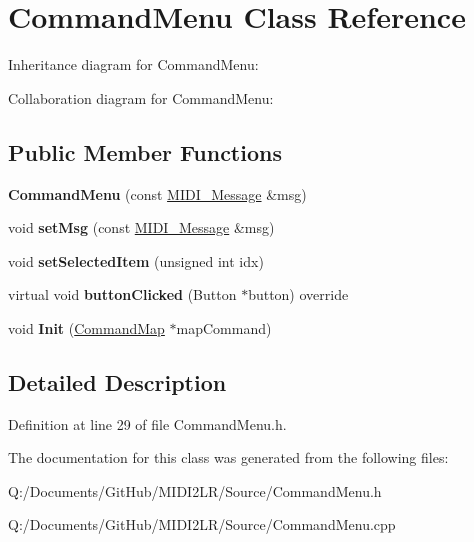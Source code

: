 \hypertarget{class_command_menu}{}\section{Command\+Menu Class Reference}
\label{class_command_menu}


Inheritance diagram for Command\+Menu\+:


Collaboration diagram for Command\+Menu\+:
\subsection*{Public Member Functions}
\begin{DoxyCompactItemize}
\item 
{\bfseries Command\+Menu} (const \hyperlink{struct_m_i_d_i___message}{M\+I\+D\+I\+\_\+\+Message} \&msg)\hypertarget{class_command_menu_a927cb9d3c584384039ac60f0aa12c250}{}\label{class_command_menu_a927cb9d3c584384039ac60f0aa12c250}

\item 
void {\bfseries set\+Msg} (const \hyperlink{struct_m_i_d_i___message}{M\+I\+D\+I\+\_\+\+Message} \&msg)\hypertarget{class_command_menu_abe597cac4bdbd0247b823d0b1d540838}{}\label{class_command_menu_abe597cac4bdbd0247b823d0b1d540838}

\item 
void {\bfseries set\+Selected\+Item} (unsigned int idx)\hypertarget{class_command_menu_aca42c2d962a51a0ab0d4450492aa44a9}{}\label{class_command_menu_aca42c2d962a51a0ab0d4450492aa44a9}

\item 
virtual void {\bfseries button\+Clicked} (Button $\ast$button) override\hypertarget{class_command_menu_a1e345fe4c3a136cb5500b4d17b63e6c7}{}\label{class_command_menu_a1e345fe4c3a136cb5500b4d17b63e6c7}

\item 
void {\bfseries Init} (\hyperlink{class_command_map}{Command\+Map} $\ast$map\+Command)\hypertarget{class_command_menu_a1c117115a7117d14bda09ecc7511c33b}{}\label{class_command_menu_a1c117115a7117d14bda09ecc7511c33b}

\end{DoxyCompactItemize}


\subsection{Detailed Description}


Definition at line 29 of file Command\+Menu.\+h.



The documentation for this class was generated from the following files\+:\begin{DoxyCompactItemize}
\item 
Q\+:/\+Documents/\+Git\+Hub/\+M\+I\+D\+I2\+L\+R/\+Source/Command\+Menu.\+h\item 
Q\+:/\+Documents/\+Git\+Hub/\+M\+I\+D\+I2\+L\+R/\+Source/Command\+Menu.\+cpp\end{DoxyCompactItemize}
